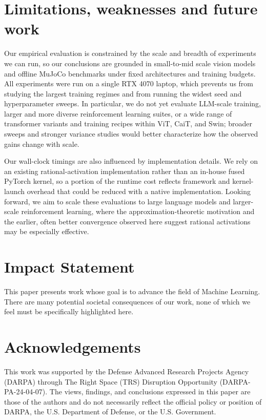 \documentclass{article}
\theoremstyle{plain}
\theoremstyle{definition}
\theoremstyle{remark}
\begin{document}
\section{Limitations, weaknesses and future work}

Our empirical evaluation is constrained by the scale and breadth of experiments we can run, so our conclusions are grounded in small-to-mid scale vision models and offline MuJoCo benchmarks under fixed architectures and training budgets. All experiments were run on a single RTX 4070 laptop, which prevents us from studying the largest training regimes and from running the widest seed and hyperparameter sweeps. In particular, we do not yet evaluate LLM-scale training, larger and more diverse reinforcement learning suites, or a wide range of transformer variants and training recipes within ViT, CaiT, and Swin; broader sweeps and stronger variance studies would better characterize how the observed gains change with scale.

Our wall-clock timings are also influenced by implementation details. We rely on an existing rational-activation implementation rather than an in-house fused PyTorch kernel, so a portion of the runtime cost reflects framework and kernel-launch overhead that could be reduced with a native implementation. Looking forward, we aim to scale these evaluations to large language models and larger-scale reinforcement learning, where the approximation-theoretic motivation and the earlier, often better convergence observed here suggest rational activations may be especially effective.

\section*{Impact Statement}
This paper presents work whose goal is to advance the field
of Machine Learning. There are many potential societal
consequences of our work, none of which we feel must be
specifically highlighted here.

\section*{Acknowledgements}
This work was supported by the Defense Advanced Research Projects Agency (DARPA) through The Right Space (TRS) Disruption Opportunity (DARPA-PA-24-04-07). The views, findings, and conclusions expressed in this paper are those of the authors and do not necessarily reflect the official policy or position of DARPA, the U.S. Department of Defense, or the U.S. Government.
\end{document}
